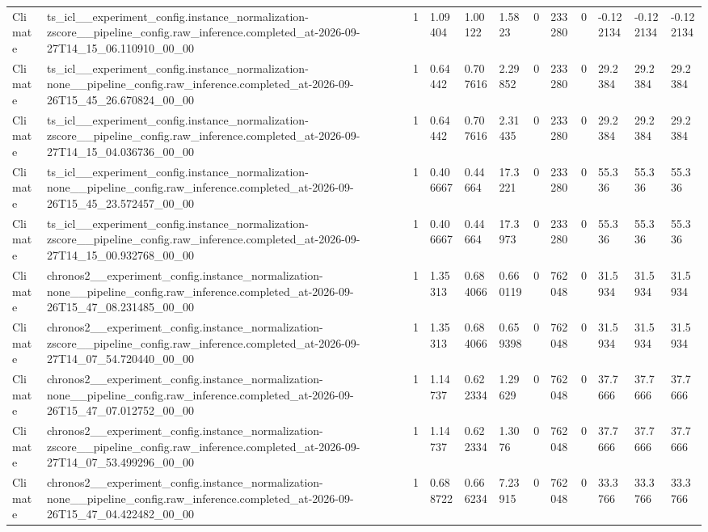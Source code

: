 \begin{tabular}{llllllllllll}
Climate & ts\_icl\_\_experiment\_config.instance\_normalization-zscore\_\_pipeline\_config.raw\_inference.completed\_at-2026-09-27T14\_15\_06.110910\_00\_00 & 1 & 1.09404 & 1.00122 & 1.5823 & 0 & 233280 & 0 & -0.122134 & -0.122134 & -0.122134 \\
Climate & ts\_icl\_\_experiment\_config.instance\_normalization-none\_\_pipeline\_config.raw\_inference.completed\_at-2026-09-26T15\_45\_26.670824\_00\_00 & 1 & 0.64442 & 0.707616 & 2.29852 & 0 & 233280 & 0 & 29.2384 & 29.2384 & 29.2384 \\
Climate & ts\_icl\_\_experiment\_config.instance\_normalization-zscore\_\_pipeline\_config.raw\_inference.completed\_at-2026-09-27T14\_15\_04.036736\_00\_00 & 1 & 0.64442 & 0.707616 & 2.31435 & 0 & 233280 & 0 & 29.2384 & 29.2384 & 29.2384 \\
Climate & ts\_icl\_\_experiment\_config.instance\_normalization-none\_\_pipeline\_config.raw\_inference.completed\_at-2026-09-26T15\_45\_23.572457\_00\_00 & 1 & 0.406667 & 0.44664 & 17.3221 & 0 & 233280 & 0 & 55.336 & 55.336 & 55.336 \\
Climate & ts\_icl\_\_experiment\_config.instance\_normalization-zscore\_\_pipeline\_config.raw\_inference.completed\_at-2026-09-27T14\_15\_00.932768\_00\_00 & 1 & 0.406667 & 0.44664 & 17.3973 & 0 & 233280 & 0 & 55.336 & 55.336 & 55.336 \\
Climate & chronos2\_\_experiment\_config.instance\_normalization-none\_\_pipeline\_config.raw\_inference.completed\_at-2026-09-26T15\_47\_08.231485\_00\_00 & 1 & 1.35313 & 0.684066 & 0.660119 & 0 & 762048 & 0 & 31.5934 & 31.5934 & 31.5934 \\
Climate & chronos2\_\_experiment\_config.instance\_normalization-zscore\_\_pipeline\_config.raw\_inference.completed\_at-2026-09-27T14\_07\_54.720440\_00\_00 & 1 & 1.35313 & 0.684066 & 0.659398 & 0 & 762048 & 0 & 31.5934 & 31.5934 & 31.5934 \\
Climate & chronos2\_\_experiment\_config.instance\_normalization-none\_\_pipeline\_config.raw\_inference.completed\_at-2026-09-26T15\_47\_07.012752\_00\_00 & 1 & 1.14737 & 0.622334 & 1.29629 & 0 & 762048 & 0 & 37.7666 & 37.7666 & 37.7666 \\
Climate & chronos2\_\_experiment\_config.instance\_normalization-zscore\_\_pipeline\_config.raw\_inference.completed\_at-2026-09-27T14\_07\_53.499296\_00\_00 & 1 & 1.14737 & 0.622334 & 1.3076 & 0 & 762048 & 0 & 37.7666 & 37.7666 & 37.7666 \\
Climate & chronos2\_\_experiment\_config.instance\_normalization-none\_\_pipeline\_config.raw\_inference.completed\_at-2026-09-26T15\_47\_04.422482\_00\_00 & 1 & 0.688722 & 0.666234 & 7.23915 & 0 & 762048 & 0 & 33.3766 & 33.3766 & 33.3766 \\

\end{tabular}

